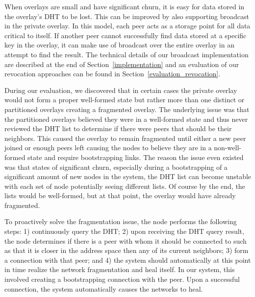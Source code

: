 \documentclass[conference]{IEEEtran}
\begin{document}

When overlays are small and have significant churn, it is easy for data stored
in the overlay's DHT to be lost.  This can be improved by also supporting
broadcast in the private overlay.  In this model, each peer acts as a
storage point for all data critical to itself.  If another peer cannot
successfully find data stored at a specific key in the overlay, it can make
use of broadcast over the entire overlay in an attempt to find
the result.  The technical details of our broadcast implementation are described
at the end of Section~\ref{implementation} and an evaluation of our revocation
approaches can be found in Section~\ref{evaluation_revocation}.

During our evaluation, we discovered that in certain cases the private overlay
would not form a proper well-formed state but rather more than one distinct or
partitioned overlays creating a fragmented overlay.  The underlying issue was that the
partitioned overlays believed they were in a well-formed state and thus never
reviewed the DHT list to determine if there were peers that should be their
neighbors.  This caused the overlay to remain fragmented until either a new
peer joined or enough peers left causing the nodes to believe they are in a
non-well-formed state and require bootstrapping links.
The reason the issue even existed was that states of significant churn,
especially during a bootstrapping of a significant amount of new nodes in the
system, the DHT list can become unstable with each set of node potentially
seeing different lists.  Of course by the end, the lists would be well-formed,
but at that point, the overlay would have already fragmented.

To proactively solve the fragmentation issue, the node performs the following
steps: 1) continuously query the DHT;  2) upon receiving the DHT query result,
the node determines if there is a peer with whom it should be connected to
such as that it is closer in the address space then any of its current neighbors;
3) form a connection with that peer; and 4) the system should automatically at
this point in time realize the network fragmentation and heal itself.  In our
system, this involved creating a bootstrapping connection with the peer.  Upon
a successful connection, the system automatically causes the networks to heal.
\end{document}
